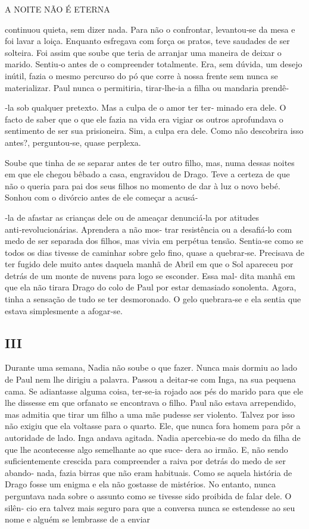 A NOITE NÃO É ETERNA

continuou quieta, sem dizer nada. Para não o confrontar, levantou‑se da
mesa e foi lavar a loiça. Enquanto esfregava com força os pratos, teve
saudades de ser solteira. Foi assim que soube que teria de arranjar uma
maneira de deixar o marido. Sentiu‑o antes de o compreender totalmente.
Era, sem dúvida, um desejo inútil, fazia o mesmo percurso do pó que
corre à nossa frente sem nunca se materializar. Paul nunca o permitiria,
tirar‑lhe‑ia a filha ou mandaria prendê‑

‑la sob qualquer pretexto. Mas a culpa de o amor ter ter‑ minado era
dele. O facto de saber que o que ele fazia na vida era vigiar os outros
aprofundava o sentimento de ser sua prisioneira. Sim, a culpa era dele.
Como não descobrira isso antes?, perguntou‑se, quase perplexa.

Soube que tinha de se separar antes de ter outro filho, mas, numa dessas
noites em que ele chegou bêbado a casa, engravidou de Drago. Teve a
certeza de que não o queria para pai dos seus filhos no momento de dar à
luz o novo bebé. Sonhou com o divórcio antes de ele começar a acusá‑

‑la de afastar as crianças dele ou de ameaçar denunciá‑la por atitudes
anti‑revolucionárias. Aprendera a não mos‑ trar resistência ou a
desafiá‑lo com medo de ser separada dos filhos, mas vivia em perpétua
tensão. Sentia‑se como se todos os dias tivesse de caminhar sobre gelo
fino, quase a quebrar‑se. Precisava de ter fugido dele muito antes
daquela manhã de Abril em que o Sol apareceu por detrás de um monte de
nuvens para logo se esconder. Essa mal‑ dita manhã em que ela não tirara
Drago do colo de Paul por estar demasiado sonolenta. Agora, tinha a
sensação de tudo se ter desmoronado. O gelo quebrara‑se e ela sentia que
estava simplesmente a afogar‑se.


\subsection{III}

Durante uma semana, Nadia não soube o que fazer. Nunca mais dormiu ao
lado de Paul nem lhe dirigiu a palavra. Passou a deitar‑se com Inga, na
sua pequena cama. Se adiantasse alguma coisa, ter‑se‑ia rojado aos pés
do marido para que ele lhe dissesse em que orfanato se encontrava o
filho. Paul não estava arrependido, mas admitia que tirar um filho a uma
mãe pudesse ser violento. Talvez por isso não exigiu que ela voltasse
para o quarto. Ele, que nunca fora homem para pôr a autoridade de lado.
Inga andava agitada. Nadia apercebia‑se do medo da filha de que lhe
acontecesse algo semelhante ao que suce‑ dera ao irmão. E, não sendo
suficientemente crescida para compreender a raiva por detrás do medo de
ser abando‑ nada, fazia birras que não eram habituais. Como se aquela
história de Drago fosse um enigma e ela não gostasse de mistérios. No
entanto, nunca perguntava nada sobre o assunto como se tivesse sido
proibida de falar dele. O silên‑ cio era talvez mais seguro para que a
conversa nunca se estendesse ao seu nome e alguém se lembrasse de a
enviar

